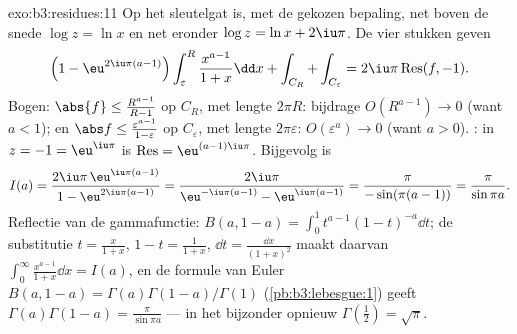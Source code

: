 \begin{solution}{exo:b3:residues:11}
Op het sleutelgat is, met de gekozen bepaling, net boven de snede
$\log z = \ln x$ en net eronder $\log z = \ln x + 2\iu\pi$. De
vier stukken geven
\[
\Bigl(1 - \eu^{2\iu\pi(a-1)}\Bigr)\int_\varepsilon^R
\frac{x^{a-1}}{1+x}\dd x + \int_{C_R} + \int_{C_\varepsilon}
= 2\iu\pi\operatorname{Res}(f, -1) .
\]
Bogen: $\abs{f} \leq \frac{R^{a-1}}{R - 1}$ op $C_R$, met lengte
$2\pi R$: bijdrage $O(R^{a-1}) \to 0$ (want $a < 1$); en $\abs f
\leq \frac{\varepsilon^{a-1}}{1 - \varepsilon}$ op
$C_\varepsilon$, met lengte $2\pi\varepsilon$: $O(\varepsilon^a)
\to 0$ (want $a > 0$). : in $z = -1 = \eu^{\iu\pi}$ is
$\operatorname{Res} = \eu^{(a-1)\iu\pi}$. Bijgevolg is
\[
I(a) = \frac{2\iu\pi\,\eu^{\iu\pi(a-1)}}{1 -
\eu^{2\iu\pi(a-1)}}
= \frac{2\iu\pi}{\eu^{-\iu\pi(a-1)} - \eu^{\iu\pi(a-1)}}
= \frac{\pi}{-\sin(\pi(a-1))} = \frac{\pi}{\sin\pi a} .
\]
Reflectie van de gammafunctie: $B(a, 1-a) =
\int_0^1t^{a-1}(1-t)^{-a}\dd t$; de substitutie $t =
\frac x{1+x}$, $1 - t = \frac1{1+x}$, $\dd t = \frac{\dd
x}{(1+x)^2}$ maakt daarvan $\int_0^\infty
\frac{x^{a-1}}{1+x}\dd x = I(a)$, en de formule van Euler $B(a,
1-a) = \Gamma(a)\Gamma(1-a)/\Gamma(1)$
(\cref{pb:b3:lebesgue:1}) geeft $\Gamma(a)\Gamma(1-a) =
\frac\pi{\sin\pi a}$ --- in het bijzonder opnieuw
$\Gamma(\tfrac12) = \sqrt\pi$.

\end{solution}

